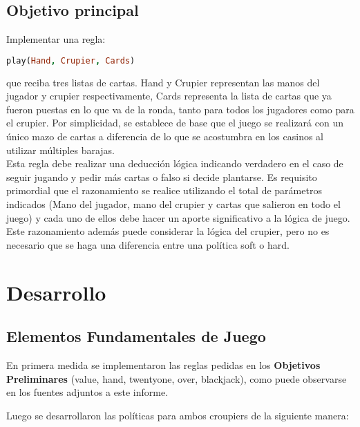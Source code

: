 \documentclass[12pt]{report}
\begin{document}
\subsection*{Objetivo principal}

Implementar una regla:

\begin{lstlisting}[language=Prolog]
play(Hand, Crupier, Cards) 
\end{lstlisting}

que reciba tres listas de cartas. Hand y Crupier representan las manos del jugador y crupier respectivamente, Cards representa la lista de cartas que ya fueron puestas en lo que va de la ronda, tanto para todos los jugadores como para el crupier. Por simplicidad, se establece de base que el juego se realizará con un único mazo de cartas a diferencia de lo que se acostumbra en los casinos al utilizar múltiples barajas.\\

Esta regla debe realizar una deducción lógica indicando verdadero en el caso de seguir jugando y pedir más cartas o falso si decide plantarse. Es requisito primordial que el razonamiento se realice utilizando el total de parámetros indicados (Mano del jugador, mano del crupier y cartas que salieron en todo el juego) y cada uno de ellos debe hacer un aporte significativo a la lógica de juego. Este razonamiento además puede considerar la lógica del crupier, pero no es necesario que se haga una diferencia entre una política soft o hard.


\section*{Desarrollo}

\subsection*{Elementos Fundamentales de Juego}

En primera medida se implementaron las reglas pedidas en los \textbf{Objetivos Preliminares} (value, hand, twentyone, over, blackjack), como puede observarse en los fuentes adjuntos a este informe. 

Luego se desarrollaron las políticas para ambos croupiers de la siguiente manera:
\end{document}
